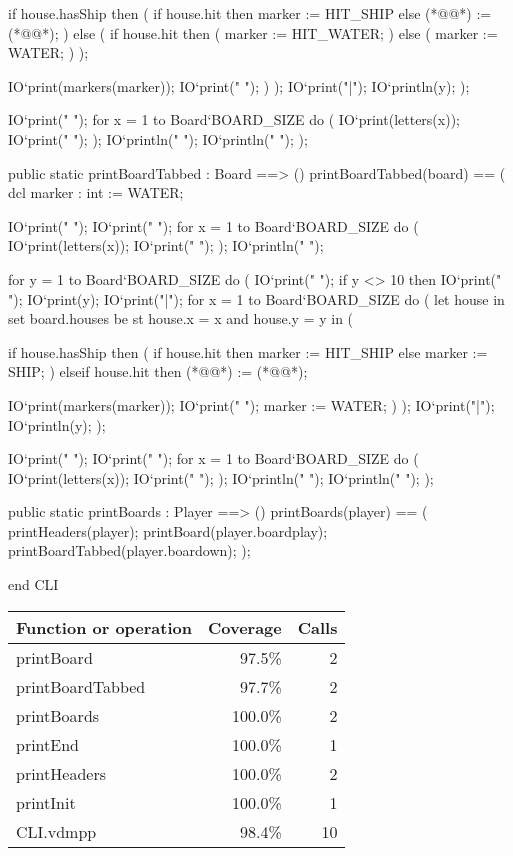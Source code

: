 \begin{vdm_al}
       if house.hasShip then (
        if house.hit then
         marker := HIT_SHIP
        else
         (*@@*) := (*@@*);
       )
       else (
        if house.hit then (
         marker := HIT_WATER;
        )
        else (
         marker := WATER;
        )
       );

       IO`print(markers(marker));
       IO`print(" ");
      )
     );
     IO`print("|");
     IO`println(y);
    );

    IO`print("   ");
    for x = 1 to Board`BOARD_SIZE do (
     IO`print(letters(x)); 
     IO`print(" ");
    );
    IO`println(" ");
    IO`println(" ");
   );
  
 
  public static printBoardTabbed : Board ==> ()
   printBoardTabbed(board) == (
    dcl marker : int := WATER;
   
    IO`print("   ");
    IO`print("           ");
    for x = 1 to Board`BOARD_SIZE do (
     IO`print(letters(x)); 
     IO`print(" ");
    );
    IO`println(" ");
    
    for y = 1 to Board`BOARD_SIZE do (
     IO`print("           ");
     if y <> 10 then IO`print(" ");
     IO`print(y);
     IO`print("|");
     for x = 1 to Board`BOARD_SIZE do (
      let house in set board.houses be st house.x = x and house.y = y in (
      
       if house.hasShip then (
        if house.hit then
         marker := HIT_SHIP
        else
         marker := SHIP;
       )
       elseif house.hit then (*@@*) := (*@@*);

       IO`print(markers(marker));
       IO`print(" ");
       marker := WATER;
      )
     );
     IO`print("|");
     IO`println(y);
    );
 
    IO`print("   ");
    IO`print("           ");
    for x = 1 to Board`BOARD_SIZE do (
     IO`print(letters(x)); 
     IO`print(" ");
    );
    IO`println(" ");
    IO`println(" ");
   );
  
  public static printBoards : Player ==> ()
   printBoards(player) == (
    printHeaders(player);
    printBoard(player.boardplay);
    printBoardTabbed(player.boardown);
   );
  
end CLI
\end{vdm_al}
\bigskip
\begin{longtable}{|l|r|r|}
\hline
Function or operation & Coverage & Calls \\
\hline
\hline
printBoard & 97.5\% & 2 \\
\hline
printBoardTabbed & 97.7\% & 2 \\
\hline
printBoards & 100.0\% & 2 \\
\hline
printEnd & 100.0\% & 1 \\
\hline
printHeaders & 100.0\% & 2 \\
\hline
printInit & 100.0\% & 1 \\
\hline
\hline
CLI.vdmpp & 98.4\% & 10 \\
\hline
\end{longtable}

